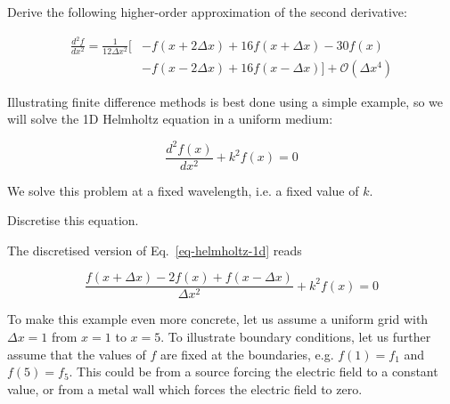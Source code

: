 \pagebreak





\begin{exer}
Derive the following higher-order approximation of the second derivative:

\begin{align}  
  \frac{d^2 f}{d x^2} = \frac{1}{12 \Delta x^2} \big[& -f(x + 2 \Delta x) + 16 f(x + \Delta x) -30 f(x) \nonumber \\
  &  - f(x - 2 \Delta x) + 16 f(x- \Delta x) \big] + \mathcal{O}\left(\Delta x^4\right)
\end{align} 
\end{exer}


\pagebreak



Illustrating finite difference methods is best done using a simple example, so we will solve the 1D Helmholtz equation in a uniform medium:

\begin{equation}
\frac{d^2 f(x)}{d x^2} + k^2 f(x) = 0 \label{eq-helmholtz-1d}
\end{equation} 

We solve this problem at a fixed wavelength, i.e. a fixed value of $k$.

\begin{cue}
  Discretise this equation.
\end{cue}

The discretised version of Eq.~\ref{eq-helmholtz-1d} reads

\begin{equation}
\frac{f(x + \Delta x) -2 f(x) + f(x- \Delta x)}{ \Delta x^2} + k^2 f(x) = 0 \label{eq-hh-diff}
\end{equation}  
 
To make this example even more concrete, let us assume a uniform grid with $\Delta x=1$ from $x=1$ to $x=5$. To illustrate boundary conditions, let us further assume that the values of $f$ are fixed at the boundaries, e.g. $f(1)=f_1$ and $f(5)=f_5$. This could be from a source forcing the electric field to a constant value, or from a metal wall which forces the electric field to zero. 

